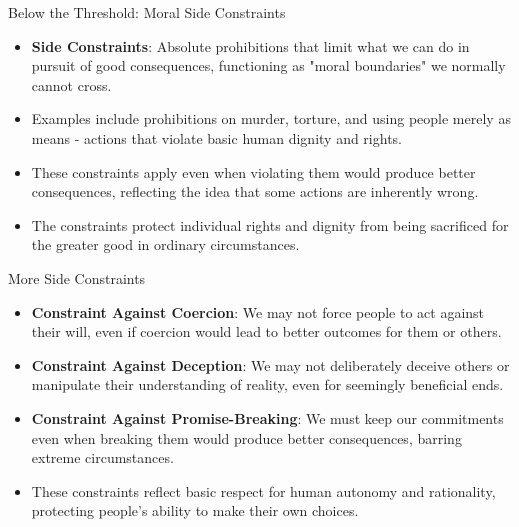 \documentclass{beamer}
\begin{document}
\begin{frame}{Below the Threshold: Moral Side Constraints}
\begin{itemize}
    \item \textbf{Side Constraints}: Absolute prohibitions that limit what we can do in pursuit of good consequences, functioning as "moral boundaries" we normally cannot cross.
    
    \item Examples include prohibitions on murder, torture, and using people merely as means - actions that violate basic human dignity and rights.
    
    \item These constraints apply even when violating them would produce better consequences, reflecting the idea that some actions are inherently wrong.
    
    \item The constraints protect individual rights and dignity from being sacrificed for the greater good in ordinary circumstances.
\end{itemize}
\end{frame}

\begin{frame}{More Side Constraints}
\begin{itemize}
    \item \textbf{Constraint Against Coercion}: We may not force people to act against their will, even if coercion would lead to better outcomes for them or others.
    
    \item \textbf{Constraint Against Deception}: We may not deliberately deceive others or manipulate their understanding of reality, even for seemingly beneficial ends.
    
    \item \textbf{Constraint Against Promise-Breaking}: We must keep our commitments even when breaking them would produce better consequences, barring extreme circumstances.
    
    \item These constraints reflect basic respect for human autonomy and rationality, protecting people's ability to make their own choices.
\end{itemize}
\end{frame}
\end{document}
